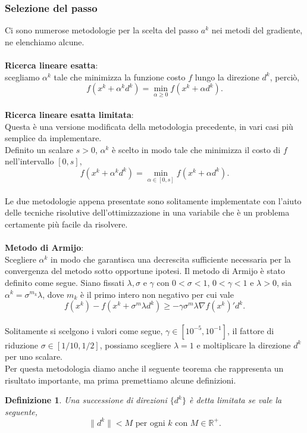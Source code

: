 \documentclass[a4paper, 12pt]{article}
\newtheorem{definition}{Definizione}
\begin{document}
\subsubsection{Selezione del passo} \label{stepsel}
Ci sono numerose metodologie per la scelta del passo $a^k$ nei metodi del gradiente, ne elenchiamo alcune.\\\\
\textbf{Ricerca lineare esatta}:\\
scegliamo $\alpha^k$ tale che minimizza la funzione costo $f$ lungo la direzione $d^k$, perciò,\\
\[f(x^k + \alpha^k d^k) = \min_{\alpha \geq 0} f(x^k + \alpha d^k).\]\\
\textbf{Ricerca lineare esatta limitata}:\\
Questa è una versione modificata della metodologia precedente, in vari casi più semplice da implementare.\\
Definito un scalare $s > 0$, $\alpha^k$ è scelto in modo tale che minimizza il costo di $f$ nell'intervallo $[0, s]$,\\
\[f(x^k + \alpha^k d^k) = \min_{\alpha \in [0, s]} f(x^k + \alpha d^k).\]\\
Le due metodologie appena presentate sono solitamente implementate con l'aiuto delle tecniche risolutive dell'ottimizzazione in una variabile che è un problema certamente più facile da risolvere.\\\\
\textbf{Metodo di Armijo}:\\
Scegliere $\alpha^k$ in modo che garantisca una decrescita sufficiente necessaria per la convergenza del metodo sotto opportune ipotesi. Il metodo di Armijo è stato definito come segue. Siano fissati $\lambda, \sigma$ e $\gamma$ con $0 < \sigma < 1$, $0 < \gamma < 1$ e $\lambda > 0$, sia $\alpha^k = \sigma^{m_k} \lambda$, dove $m_k$ è il primo intero non negativo per cui vale\\
\[f(x^k) - f(x^k + \sigma^m \lambda d^k) \geq -\gamma \sigma^m \lambda \nabla f(x^k)'d^k.\]\\
Solitamente si scelgono i valori come segue, $\gamma \in [10^{-5}, 10^{-1}]$, il fattore di riduzione $\sigma \in [1/10, 1/2]$, possiamo scegliere $\lambda = 1$ e moltiplicare la direzione $d^k$ per uno scalare.\\
Per questa metodologia diamo anche il seguente teorema che rappresenta un risultato importante, ma prima premettiamo alcune definizioni.
\begin{definition}
Una successione di direzioni $\{d^k\}$ è detta limitata se vale la seguente,\\ \[\| d^k \| < M \mbox{ per ogni } k \mbox{ con } M \in \mathbb{R}^+.\]
\end{definition}
\end{document}
